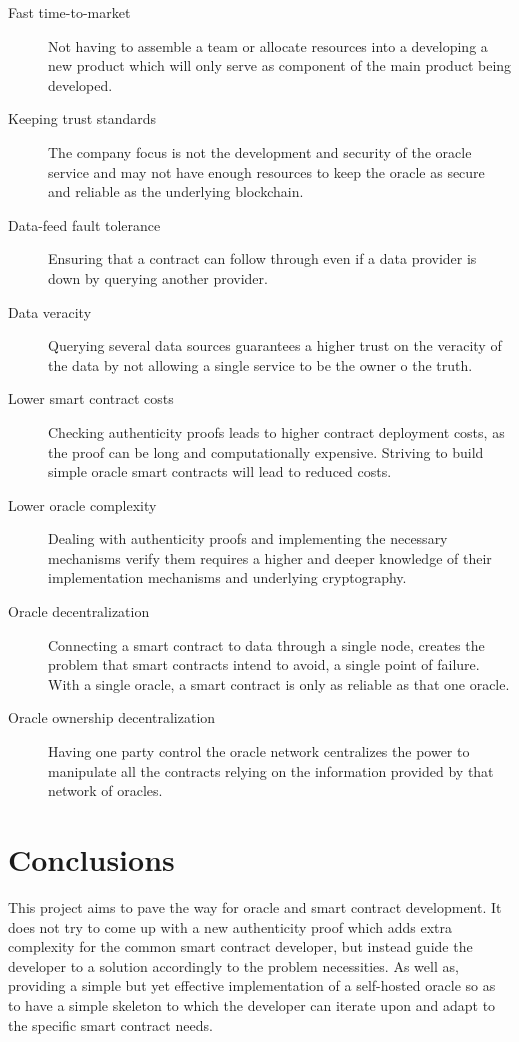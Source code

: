 \begin{description}
    \item [Fast time-to-market] Not having to assemble a team or allocate resources into a developing a new product which will only serve as component of the main product being developed.
    \item [Keeping trust standards] The company focus is not the development and security of the  oracle  service and  may  not  have  enough  resources  to  keep  the  oracle  as  secure  and reliable as the underlying blockchain.
    \item [Data-feed fault tolerance] Ensuring  that  a  contract  can  follow  through  even  if  a  data provider is down by querying another provider.
    \item [Data veracity] Querying several data sources guarantees a higher trust on the veracity of the data by not allowing a single service to be the owner o the truth.
    \item [Lower smart contract costs] Checking authenticity proofs leads to higher contract deployment costs, as the proof can be long and computationally expensive. Striving to build simple oracle smart contracts will lead to reduced costs.
    \item [Lower oracle complexity] Dealing with authenticity proofs and implementing the necessary mechanisms verify them requires a higher and deeper knowledge of their implementation mechanisms and underlying cryptography.
    \item [Oracle decentralization] Connecting a smart contract to data through a single node, creates the problem that smart contracts intend to avoid, a single point of failure.  With a single oracle, a smart contract is only as reliable as that one oracle.
    \item [Oracle ownership decentralization] Having one party control the oracle network centralizes the power to manipulate all the contracts relying on the information provided by that network of oracles.
\end{description}


\section{Conclusions}
This project aims to pave the way for oracle and smart contract development. It does not try to come up with a new authenticity proof which adds extra complexity for the common smart contract developer, but instead guide the developer to a solution accordingly to the problem necessities. As well as, providing a simple but yet effective implementation of a self-hosted oracle so as to have a simple skeleton to which the developer can iterate upon and adapt to the specific smart contract needs.